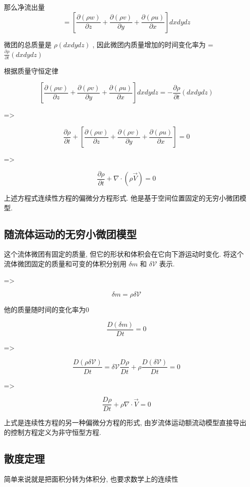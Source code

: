 \documentclass[UTF8]{ctexart}
\begin{document}
那么净流出量 $$=[\frac{\partial (\rho w)}{\partial z} + \frac{\partial (\rho v)}{\partial y} + \frac{\partial (\rho u)}{\partial x} ] dxdydz$$

微团的总质量是 $\rho (dxdydz)$ , 因此微团内质量增加的时间变化率为 = $\frac{\partial \rho}{\partial t} (dxdydz)$


根据质量守恒定律

$$
	[\frac{\partial (\rho w)}{\partial z} + \frac{\partial (\rho v)}{\partial y} + \frac{\partial (\rho u)}{\partial x} ] dxdydz = -\frac{\partial \rho}{\partial t} (dxdydz)
$$

=>

$$

	\frac{\partial \rho}{\partial t}  + [\frac{\partial (\rho w)}{\partial z} + \frac{\partial (\rho v)}{\partial y} + \frac{\partial (\rho u)}{\partial x} ] = 0

$$

=>

$$
	\frac{\partial \rho}{\partial t} + \nabla \cdot (\rho \vec{V}) = 0
$$

上述方程式连续性方程的偏微分方程形式. 他是基于空间位置固定的无穷小微团模型.

\subsection{随流体运动的无穷小微团模型}
这个流体微团有固定的质量, 但它的形状和体积会在它向下游运动时变化. 将这个流体微团固定的质量和可变的体积分别用 $\delta m$ 和 $\delta \mathcal{V}$ 表示.

=>

$$
	\delta m = \rho \delta \mathcal{V}
$$

他的质量随时间的变化率为0

$$
	\frac{D(\delta m)}{Dt} = 0
$$

=>

$$
	\frac{D(\rho \delta \mathcal{V})}{Dt} = \delta \mathcal{V} \frac{D\rho}{Dt} + \rho \frac{D(\delta \mathcal{V})}{Dt} = 0
$$

=>

$$
	\frac{D\rho}{Dt} + \rho \nabla \cdot \vec{V} = 0
$$

上式是连续性方程的另一种偏微分方程的形式, 由岁流体运动额流动模型直接导出的控制方程定义为非守恒型方程.

\subsection{散度定理}
简单来说就是把面积分转为体积分, 也要求数学上的连续性
\end{document}
